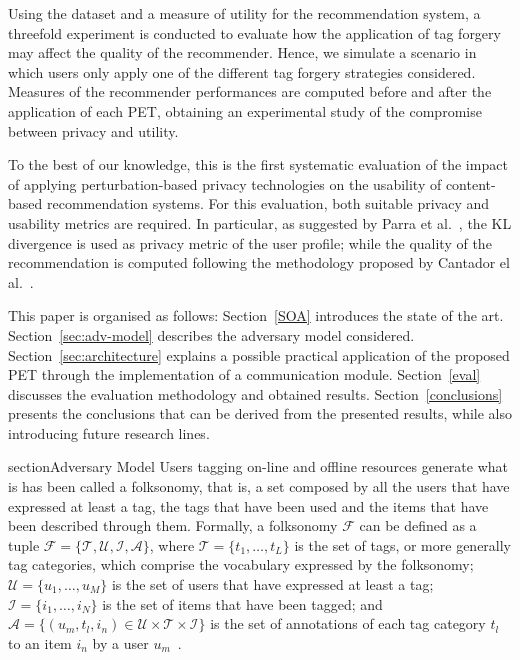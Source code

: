 Using the dataset and a measure of utility for the recommendation system, a threefold experiment is conducted to evaluate how the application of tag forgery may affect the quality of the recommender. Hence, we simulate a scenario in which users only apply one of the different tag forgery strategies considered. Measures of the recommender performances are computed before and after the application of each PET, obtaining an experimental study of the compromise between privacy and utility.

To the best of our knowledge, this is the first systematic evaluation of the impact of applying perturbation-based privacy technologies on the usability of content-based recommendation systems. For this evaluation, both suitable privacy and usability metrics are required. In particular, as suggested by Parra et al.~\cite{parra2014measuring}, the KL divergence is used as privacy metric of the user profile; while the quality of the recommendation is computed following the methodology proposed by Cantador el al.~\cite{a02}.

This paper is organised as follows: Section~\ref{SOA} introduces the state of the art. Section~\ref{sec:adv-model} describes the adversary model considered. Section~\ref{sec:architecture} explains a possible practical application of the proposed PET through the implementation of a communication module. Section~\ref{eval} discusses the evaluation methodology and obtained results. Section~\ref{conclusions} presents the conclusions that can be derived from the presented results, while also introducing future research lines.

section{Adversary Model}
\label{sec:adv-model}
Users tagging on-line and offline resources generate what is has been called a folksonomy, that is, a set composed by all the users that have expressed at least a tag, the tags that have been used and the items that have been described through them.
Formally, a folksonomy $\mathcal{F}$ can be defined as a tuple $\mathcal{F}=\{\mathcal{T},\mathcal{U},\mathcal{I},\mathcal{A}\}$, where $\mathcal{T}=\{t_1,\ldots,t_L\}$ is the set of tags, or more generally tag categories, which comprise the vocabulary expressed by the folksonomy; $\mathcal{U}=\{u_1,\ldots,u_M\}$ is the set of users that have expressed at least a tag; $\mathcal{I}=\{i_1,\ldots,i_N\}$ is the set of items that have been tagged; and $\mathcal{A}=\{(u_m, t_l, i_n) \in \mathcal{U} \times \mathcal{T} \times \mathcal{I} \}$ is the set of annotations of each tag category $t_l$ to an item $i_n$ by a user $u_m$~\cite{a02}.


